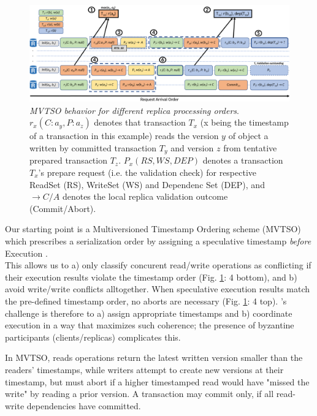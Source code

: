 \begin{figure}
\begin{center}
\includegraphics[width= \textwidth]{./figures/MVTSOLargeFont.png}
\end{center}
\caption{\emph{MVTSO behavior for different replica processing orders}. $r_x(C : a_y ,P : a_z)$ denotes that transaction $T_x$ (x being the timestamp of a transaction in this example) reads the version $y$ of object a written by committed transaction $T_y$ and version $z$ from tentative prepared transaction $T_z$. $P_x(RS,WS,DEP)$ denotes a transaction $T_x$'s prepare request (i.e. the validation check) for respective ReadSet (RS), WriteSet (WS) and Dependenc Set (DEP), and $\rightarrow C / A$ denotes the local replica validation outcome (Commit/Abort).} 
\label{fig:MVTSOEX}
\end{figure}

Our starting point is a Multiversioned Timestamp Ordering scheme (MVTSO) which prescribes a serialization order by assigning a speculative timestamp \textit{before} Execution \cite{bernstein1983multiversion, reed1983implementing, su2017tebaldi}. \\
 This allows us to a) only classify concurent read/write operations as conflicting if their execution results violate the timestamp order (Fig. \ref{fig:MVTSOEX}: 4 bottom), and b) avoid write/write conflicts alltogether. 
When speculative execution results match the pre-defined timestamp order, no aborts are necessary (Fig. \ref{fig:MVTSOEX}: 4 top). \sys{}'s challenge is therefore to a) assign appropriate timestamps and b) coordinate execution in a way that maximizes such coherence; the presence of byzantine participants (clients/replicas) complicates this.

In MVTSO, reads operations return the latest written version smaller than the readers' timestamps, while writers attempt to create new versions at their timestamp, but must abort if a higher timestamped read would have "missed the write" by reading a prior version. A transaction may commit only, if all read-write dependencies have committed.

